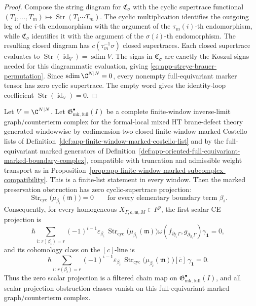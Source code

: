 \begin{proof}
  Compose the string diagram for \(\mathfrak C_\sigma\) with the cyclic
  supertrace functional
  \((T_1,\ldots,T_m)\mapsto\operatorname{Str}(T_1\cdots T_m)\).  The
  cyclic multiplication identifies the outgoing leg of the \(i\)-th
  endomorphism with the argument of the \(\tau_m(i)\)-th endomorphism,
  while \(\mathfrak C_\sigma\) identifies it with the argument of the
  \(\sigma(i)\)-th endomorphism.  The resulting closed diagram has
  \(c(\tau_m^{-1}\sigma)\) closed supertraces.  Each closed supertrace
  evaluates to
  \(\operatorname{Str}(\operatorname{id}_V)=\operatorname{sdim}V\).
  The signs in \(\mathfrak C_\sigma\) are exactly the Koszul signs needed
  for this diagrammatic evaluation, giving
  \eqref{eq:app-strcyc-brauer-permutation}.  Since
  \(\operatorname{sdim}\C^{N|N}=0\), every nonempty full-equivariant
  marker tensor has zero cyclic supertrace.  The empty word gives the
  identity-loop coefficient
  \(\operatorname{Str}(\operatorname{id}_V)=0\).
\end{proof}

\begin{thm}
\label{thm:app-full-equivariant-marked-shadow-vanishing}
  Let \(V=\C^{N|N}\).  Let
  \(\mathfrak G^\bullet_{\mathrm{mk,full}}(I)\) be a complete
  finite-window inverse-limit graph/counterterm complex for the
  formal-local mixed HT brane-defect theory generated
  windowwise by codimension-two closed finite-window marked Costello lists
  of Definition~\ref{def:app-finite-window-marked-costello-list} and by the
  full-equivariant marked generators of
  Definition~\ref{def:app-oriented-full-equivariant-marked-boundary-complex},
  compatible with truncation and admissible weight transport as in
  Proposition~\ref{prop:app-finite-window-marked-subcomplex-compatibility}.
  This is a finite-list statement in every window.  Then the marked
  preservation obstruction has zero
  cyclic-supertrace projection:
  \[
    \operatorname{Str}_{\mathrm{cyc}}
      \bigl(\mu_{\beta_i}(\mathfrak m)\bigr)=0
    \qquad\text{for every elementary boundary term } \beta_i.
  \]
  Consequently, for every homogeneous
  \(X_{\Gamma,o,\mathfrak m,M}\in F^p\), the first scalar CE projection is
  \[
    \hbar
    \sum_{i:\,r(\beta_i)=r}
      (-1)^{i-1}
      \varepsilon_{\beta_i}\,
      \operatorname{Str}_{\mathrm{cyc}}
        \bigl(\mu_{\beta_i}(\mathfrak m)\bigr)
      \omega(f_{\partial_{\beta_i}\Gamma},
             g_{\partial_{\beta_i}\Gamma})
      \gamma_{\mathbf 1}
      =0,
  \]
  and its cohomology class on the \([\bar c]\)-line is
  \[
    \hbar
    \sum_{i:\,r(\beta_i)=r}
      (-1)^{i-1}
      \varepsilon_{\beta_i}\,
      \operatorname{Str}_{\mathrm{cyc}}
        \bigl(\mu_{\beta_i}(\mathfrak m)\bigr)
      [\bar c]\,\gamma_{\mathbf 1}
      =0 .
  \]
  Thus the zero scalar projection is a filtered chain map on
  \(\mathfrak G^\bullet_{\mathrm{mk,full}}(I)\), and all scalar
  projection obstruction classes vanish on this full-equivariant marked
  graph/counterterm complex.
\end{thm}

